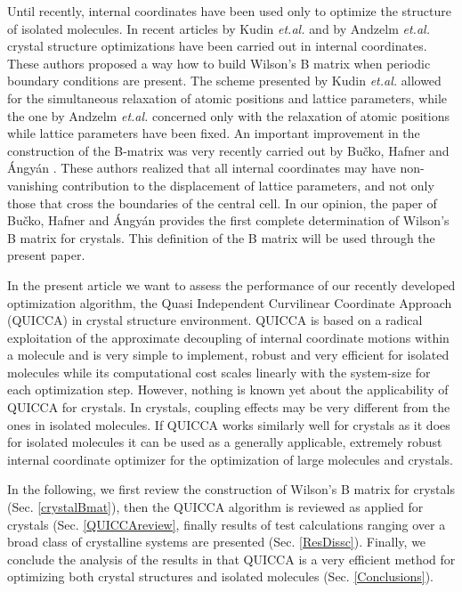 \documentclass[prl,aps,preprint,superbib,12pt]{revtex4}
\begin{document}
Until recently, internal coordinates have been used only to optimize
the structure of isolated molecules.
In recent articles by Kudin {\it et.al.} \cite{KKudin01} and by
Andzelm {\it et.al.} \cite{JAndzelm01} crystal structure optimizations
have been carried out in internal coordinates.
These authors proposed a way
how to build Wilson's B matrix \cite{EWilson55} 
when periodic boundary conditions are present. 
The scheme presented by Kudin {\it et.al.} \cite{KKudin01} allowed for 
the simultaneous relaxation of atomic positions and lattice parameters,
while the one by Andzelm {\it et.al.} \cite{JAndzelm01}  concerned only 
with the relaxation of atomic positions while lattice parameters have 
been fixed. 
An important improvement in the construction of the B-matrix
was very recently carried out by Bu\v{c}ko, Hafner and {\'A}ngy{\'a}n
\cite{TBucko05}.
These authors realized that 
all internal coordinates may have non-vanishing contribution
to the displacement of lattice parameters, and not only those
that cross the boundaries of the central cell. 
In our opinion, the paper of Bu\v{c}ko, Hafner and {\'A}ngy{\'a}n
provides the first complete determination of Wilson's B matrix
for crystals. This definition of the B matrix will be used through
the present paper. 

In the present article we want to assess the performance of our recently
developed optimization algorithm, the Quasi Independent Curvilinear 
Coordinate Approach (QUICCA) \cite{KNemeth04} 
in crystal structure environment.
QUICCA is based on a radical exploitation of the approximate decoupling
of internal coordinate motions within a molecule and is very simple 
to implement, robust and very efficient for isolated molecules while
its computational cost scales linearly with the system-size for each 
optimization step. However, nothing is known yet about the 
applicability of QUICCA for crystals. In crystals, coupling effects
may be very different from the ones in isolated molecules. If QUICCA
works similarly well for crystals as it does for isolated molecules
it can be used as a generally applicable, extremely robust 
internal coordinate optimizer for the optimization of large 
molecules and crystals. 

In the following, we first review the construction of Wilson's B matrix
for crystals (Sec. \ref{crystalBmat}), then the QUICCA algorithm is 
reviewed as applied for crystals (Sec. \ref{QUICCAreview}, 
finally results of test calculations
ranging over a broad class of crystalline systems are presented
(Sec. \ref{ResDissc}). Finally, we conclude the analysis of the results
in that QUICCA is a very efficient method for optimizing both
crystal structures and isolated molecules (Sec. \ref{Conclusions}).
\end{document}
